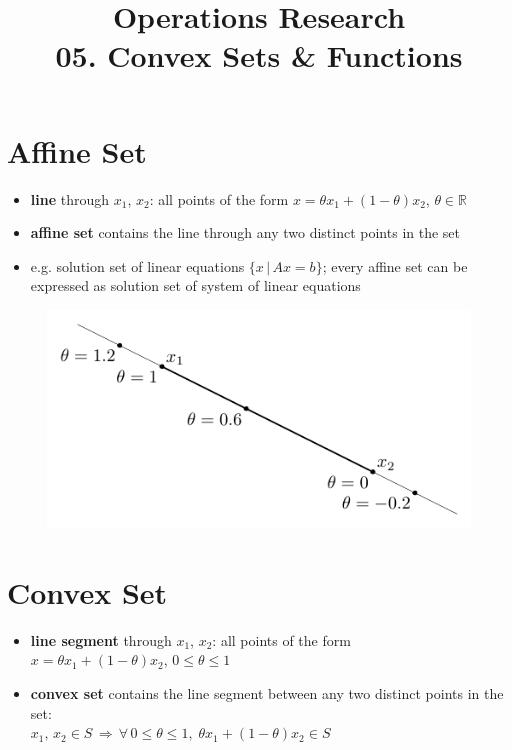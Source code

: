 \documentclass[11pt]{extarticle}
\newcommand{\ds}{\displaystyle}
\newcommand{\ie}{\,\Longrightarrow\,}
\theoremstyle{definition}
\begin{document}
\title{\texorpdfstring{\vspace{15mm} Operations Research\\ 05. Convex Sets \& Functions}{Operations Research\\ 05. Convex Sets \& Functions}} 
\author{}
\date{}
\maketitle
\newpage

\section*{Affine Set}

\begin{itemize}
  \item {\bf line} through $x_1$, $x_2$: all points of the form $\ds x = \theta x_1 + (1 - \theta) x_2$, $\theta\in\mathbb{R}$
  \item {\bf affine set} contains the line through any two distinct points in the set
  \item e.g. solution set of linear equations $\ds\{x\,|\,Ax = b\}$; every affine set can be expressed as solution set of system of linear equations
\end{itemize}

\begin{figure}[!htbp]
  \centering
  \includegraphics[scale=0.75,page=1]{fig/02.pdf}
\end{figure}

\newpage

\section*{Convex Set}
\begin{itemize}
  \item {\bf line segment} through $x_1$, $x_2$: all points of the form \\$\ds x = \theta x_1 + (1 - \theta) x_2$, $0\leqslant\theta\leqslant 1$
  \item {\bf convex set} contains the line segment between any two distinct points in the set: \\$\ds x_1,\,x_2\in S\ie \forall\,0\leqslant\theta\leqslant 1,\;\theta x_1 + (1 - \theta) x_2\in S$
\end{itemize}
\end{document}
